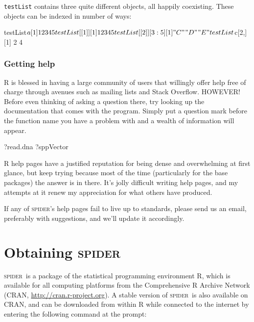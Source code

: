 \documentclass{article}
\newcommand{\spider}{\textsc{spider}~} %
\newcommand{\Spider}{\textsc{spider}} %
\newcommand{\progname}[1]{\textsc{#1}}
\newcommand{\fun}[1]{\texttt{#1}}
\begin{document}
\fun{testList} contains three quite different objects, all happily coexisting. These objects can be indexed in number of ways:

\begin{Rio}
testList$a
[1] 1 2 3 4 5
testList[[1]]
[1] 1 2 3 4 5
testList[[2]][3:5]
[1] "C" "D" "E"
testList$c[2,]
[1] 2 4
\end{Rio}




\subsubsection{Getting help}
\progname{R} is blessed in having a large community of users that willingly offer help free of charge through avenues such as mailing lists and Stack Overflow. HOWEVER! Before even thinking of asking a question there, try looking up the documentation that comes with the program. Simply put a question mark before the function name you have a problem with and a wealth of information will appear. 

\begin{console}
?read.dna
?sppVector
\end{console}

\progname{R} help pages have a justified reputation for being dense and overwhelming at first glance, but keep trying because most of the time (particularly for the base packages) the answer is in there. It's jolly difficult writing help pages, and my attempts at it renew my appreciation for what others have produced.

If any of \Spider's help pages fail to live up to standards, please send us an email, preferably with suggestions, and we'll update it accordingly.



\section{Obtaining \spider}
\spider is a package of the statistical programming environment \progname{R}, which is available for all computing platforms from the Comprehensive R Archive Network (CRAN, \href{http://cran.r-project.org}{http://cran.r-project.org}). A stable version of \spider is also available on CRAN, and can be downloaded from within R while connected to the internet by entering the following command at the prompt:
\end{document}
